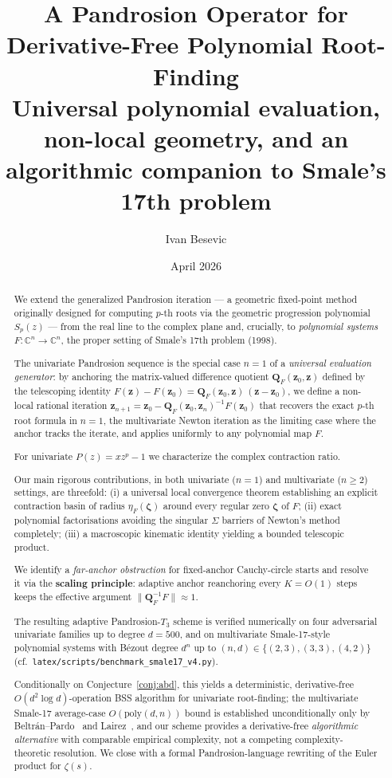\documentclass[11pt,a4paper]{article}
\title{A Pandrosion Operator for Derivative-Free Polynomial Root-Finding \\ \large Universal polynomial evaluation, non-local geometry, and an algorithmic companion to Smale's 17th problem}
\author{Ivan Besevic}
\date{April 2026}
\begin{document}
\maketitle

\begin{abstract}
We extend the generalized Pandrosion iteration --- a geometric fixed-point method originally designed for computing $p$-th roots via the geometric progression polynomial $S_p(z)$ --- from the real line to the complex plane and, crucially, to \emph{polynomial systems} $F: \mathbb{C}^n \to \mathbb{C}^n$, the proper setting of Smale's 17th problem (1998).

The univariate Pandrosion sequence is the special case $n = 1$ of a \emph{universal evaluation generator}: by anchoring the matrix-valued difference quotient $\mathbf{Q}_F(\mathbf{z}_0, \mathbf{z})$ defined by the telescoping identity $F(\mathbf{z}) - F(\mathbf{z}_0) = \mathbf{Q}_F(\mathbf{z}_0, \mathbf{z})\,(\mathbf{z} - \mathbf{z}_0)$, we define a non-local rational iteration $\mathbf{z}_{n+1} = \mathbf{z}_0 - \mathbf{Q}_F(\mathbf{z}_0, \mathbf{z}_n)^{-1} F(\mathbf{z}_0)$ that recovers the exact $p$-th root formula in $n = 1$, the multivariate Newton iteration as the limiting case where the anchor tracks the iterate, and applies uniformly to any polynomial map $F$.

For univariate $P(z) = xz^p - 1$ we characterize the complex contraction ratio.

Our main rigorous contributions, in both univariate ($n = 1$) and multivariate ($n \ge 2$) settings, are threefold: (i) a universal local convergence theorem establishing an explicit contraction basin of radius $\eta_F(\boldsymbol\zeta)$ around every regular zero $\boldsymbol\zeta$ of $F$; (ii) exact polynomial factorisations avoiding the singular $\Sigma$ barriers of Newton's method completely; (iii) a macroscopic kinematic identity yielding a bounded telescopic product.

We identify a \emph{far-anchor obstruction} for fixed-anchor Cauchy-circle starts and resolve it via the \textbf{scaling principle}: adaptive anchor reanchoring every $K = O(1)$ steps keeps the effective argument $\|\mathbf{Q}_F^{-1} F\| \approx 1$.

The resulting adaptive Pandrosion-$T_3$ scheme is verified numerically on four adversarial univariate families up to degree $d = 500$, and on multivariate Smale-17-style polynomial systems with B\'ezout degree $d^n$ up to $(n, d) \in \{(2, 3), (3, 3), (4, 2)\}$ (cf.\ \verb|latex/scripts/benchmark_smale17_v4.py|).

Conditionally on Conjecture~\ref{conj:abd}, this yields a deterministic, derivative-free $O(d^2 \log d)$-operation BSS algorithm for univariate root-finding; the multivariate Smale-17 average-case $O(\mathrm{poly}(d, n))$ bound is established unconditionally only by Beltr\'an--Pardo~\cite{beltranpardo} and Lairez~\cite{lairez}, and our scheme provides a derivative-free \emph{algorithmic alternative} with comparable empirical complexity, not a competing complexity-theoretic resolution. We close with a formal Pandrosion-language rewriting of the Euler product for $\zeta(s)$.
\end{abstract}
\end{document}
